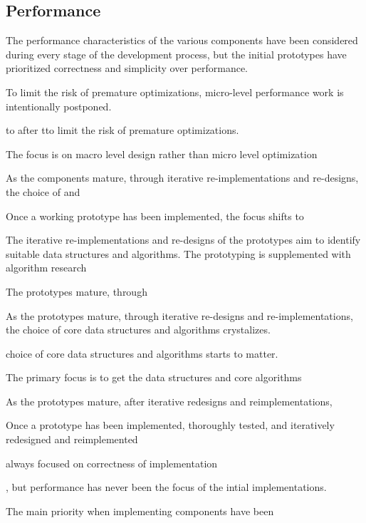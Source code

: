 
\subsection{Performance}

The performance characteristics of the various components have been considered during every stage of the development process, but the initial prototypes have prioritized correctness and simplicity over performance.

To limit the risk of premature optimizations, micro-level performance work is intentionally postponed.

 to after tto limit the risk of premature optimizations.

The focus is on macro level design rather than micro level optimization

As the components mature, through iterative re-implementations and re-designs, the choice of  and

Once a working prototype has been implemented, the focus shifts to

The iterative re-implementations and re-designs of the prototypes aim to identify suitable data structures and algorithms. The prototyping is supplemented with algorithm research


The prototypes mature, through



As the prototypes mature, through iterative re-designs and re-implementations, the choice of core data structures and algorithms crystalizes.

choice of core data structures and algorithms starts to matter.

The primary focus is to get the data structures and core algorithms

As the prototypes mature, after iterative redesigns and reimplementations,

Once a prototype has been implemented, thoroughly tested, and iteratively redesigned and reimplemented



always focused on correctness of implementation

, but performance has never been the focus of the intial implementations.

The main priority when implementing components have been

